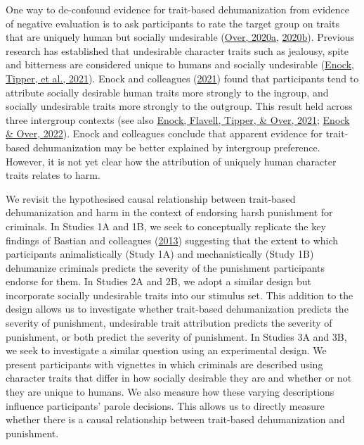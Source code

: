 \documentclass[
]{article}
\begin{document}
One way to de-confound evidence for trait-based dehumanization from evidence of negative evaluation is to ask participants to rate the target group on traits that are uniquely human but socially undesirable (\protect\hyperlink{ref-Over2020a}{Over, 2020a}, \protect\hyperlink{ref-Over2020b}{2020b}). Previous research has established that undesirable character traits such as jealousy, spite and bitterness are considered unique to humans and socially undesirable (\protect\hyperlink{ref-Enock2021a}{Enock, Tipper, et al., 2021}). Enock and colleagues (\protect\hyperlink{ref-Enock2021a}{2021}) found that participants tend to attribute socially desirable human traits more strongly to the ingroup, and socially undesirable traits more strongly to the outgroup. This result held across three intergroup contexts (see also \protect\hyperlink{ref-Enock2021b}{Enock, Flavell, Tipper, \& Over, 2021}; \protect\hyperlink{ref-Enock2022}{Enock \& Over, 2022}). Enock and colleagues conclude that apparent evidence for trait-based dehumanization may be better explained by intergroup preference. However, it is not yet clear how the attribution of uniquely human character traits relates to harm.

We revisit the hypothesised causal relationship between trait-based dehumanization and harm in the context of endorsing harsh punishment for criminals. In Studies 1A and 1B, we seek to conceptually replicate the key findings of Bastian and colleagues (\protect\hyperlink{ref-Bastian2013}{2013}) suggesting that the extent to which participants animalistically (Study 1A) and mechanistically (Study 1B) dehumanize criminals predicts the severity of the punishment participants endorse for them. In Studies 2A and 2B, we adopt a similar design but incorporate socially undesirable traits into our stimulus set. This addition to the design allows us to investigate whether trait-based dehumanization predicts the severity of punishment, undesirable trait attribution predicts the severity of punishment, or both predict the severity of punishment. In Studies 3A and 3B, we seek to investigate a similar question using an experimental design. We present participants with vignettes in which criminals are described using character traits that differ in how socially desirable they are and whether or not they are unique to humans. We also measure how these varying descriptions influence participants' parole decisions. This allows us to directly measure whether there is a causal relationship between trait-based dehumanization and punishment.
\end{document}
